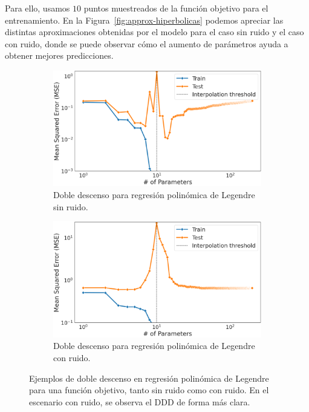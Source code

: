 Para ello, usamos $10$ puntos muestreados de la función objetivo para el entrenamiento. En la Figura~\ref{fig:approx-hiperbolicas} podemos apreciar las distintas aproximaciones obtenidas por el modelo para el caso sin ruido y el caso con ruido, donde se puede observar cómo el aumento de parámetros ayuda a obtener mejores predicciones.

\begin{figure}[h]
    \centering
    \begin{subfigure}[b]{0.48\textwidth}
        \centering
        \includegraphics[width=\textwidth]{img/experiments/hiperbolica_noiselessDDD.png}
        \caption{Doble descenso para regresión polinómica de Legendre sin ruido.}\label{fig:hiperbolica_noiselessDDD}
    \end{subfigure}
    \hfill
    \begin{subfigure}[b]{0.48\textwidth}
        \centering
        \includegraphics[width=\textwidth]{img/experiments/hiperbolica_noiseDDD.png}
        \caption{Doble descenso para regresión polinómica de Legendre con ruido.}\label{fig:hiperbolica_noiseDDD}
    \end{subfigure}
    \caption[Ejemplos de doble descenso en regresión polinómica de Legendre para una función objetivo, tanto con ruido como sin ruido.]{Ejemplos de doble descenso en regresión polinómica de Legendre para una función objetivo, tanto sin ruido como con ruido. En el escenario con ruido, se observa el DDD de forma más clara.}\label{fig:legendrehyperbolicDD}
\end{figure}

